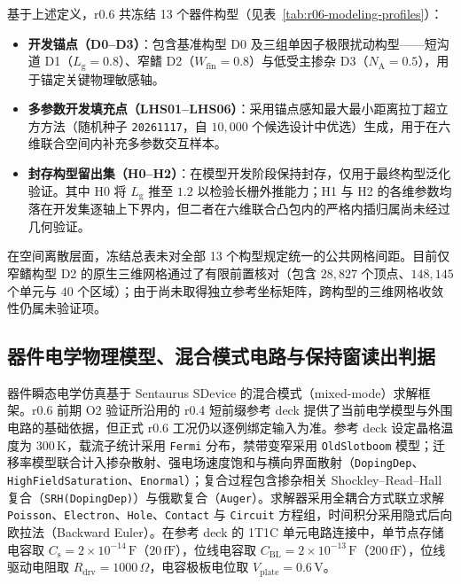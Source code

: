 基于上述定义，r0.6 共冻结 13 个器件构型（见表~\ref{tab:r06-modeling-profiles}）：
\begin{itemize}
  \item \textbf{开发锚点（D0--D3）}：包含基准构型 D0 及三组单因子极限扰动构型——短沟道 D1（$L_{\mathrm{g}}=0.8$）、窄鳍 D2（$W_{\mathrm{fin}}=0.8$）与低受主掺杂 D3（$N_{\mathrm{A}}=0.5$），用于锚定关键物理敏感轴。
  \item \textbf{多参数开发填充点（LHS01--LHS06）}：采用锚点感知最大最小距离拉丁超立方方法（随机种子 \texttt{20261117}，自 $10{,}000$ 个候选设计中优选）生成，用于在六维联合空间内补充多参数交互样本。
  \item \textbf{封存构型留出集（H0--H2）}：在模型开发阶段保持封存，仅用于最终构型泛化验证。其中 H0 将 $L_{\mathrm{g}}$ 推至 $1.2$ 以检验长栅外推能力；H1 与 H2 的各维参数均落在开发集逐轴上下界内，但二者在六维联合凸包内的严格内插归属尚未经过几何验证。
\end{itemize}

在空间离散层面，冻结总表未对全部 13 个构型规定统一的公共网格间距。目前仅窄鳍构型 D2 的原生三维网格通过了有限前置核对（包含 $28{,}827$ 个顶点、$148{,}145$ 个单元与 $40$ 个区域）；由于尚未取得独立参考坐标矩阵，跨构型的三维网格收敛性仍属未验证项。

\subsection{器件电学物理模型、混合模式电路与保持窗读出判据}
\label{subsec:ch02-electrical-timing}

器件瞬态电学仿真基于 Sentaurus SDevice 的混合模式（mixed-mode）求解框架。r0.6 前期 O2 验证所沿用的 r0.4 短前缀参考 deck 提供了当前电学模型与外围电路的基础依据，但正式 r0.6 工况仍以逐例绑定输入为准。参考 deck 设定晶格温度为 $300\,\mathrm{K}$，载流子统计采用 \texttt{Fermi} 分布，禁带变窄采用 \texttt{OldSlotboom} 模型；迁移率模型联合计入掺杂散射、强电场速度饱和与横向界面散射（\texttt{DopingDep}、\texttt{HighFieldSaturation}、\texttt{Enormal}）；复合过程包含掺杂相关 Shockley--Read--Hall 复合（\texttt{SRH(DopingDep)}）与俄歇复合（\texttt{Auger}）。求解器采用全耦合方式联立求解 \texttt{Poisson}、\texttt{Electron}、\texttt{Hole}、\texttt{Contact} 与 \texttt{Circuit} 方程组，时间积分采用隐式后向欧拉法（Backward Euler）。在参考 deck 的 1T1C 单元电路连接中，单节点存储电容取 $C_{\mathrm{s}}=2\times 10^{-14}\,\mathrm{F}$（$20\,\mathrm{fF}$），位线电容取 $C_{\mathrm{BL}}=2\times 10^{-13}\,\mathrm{F}$（$200\,\mathrm{fF}$），位线驱动电阻取 $R_{\mathrm{drv}}=1000\,\Omega$，电容极板电位取 $V_{\mathrm{plate}}=0.6\,\mathrm{V}$。

